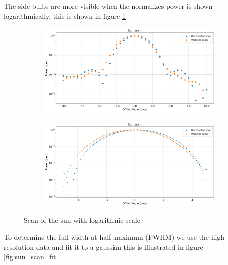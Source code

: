 The side bulbs are more visible when the normalizes power is shown logarithmically, this is shown in figure \ref{fig:sun_scan_log}
\begin{figure}[ht]
    \begin{subfigure}[t]{0.49\linewidth}
        \includegraphics[width=0.9\linewidth]{assets/sun_scan_low_res_log.png}
    \end{subfigure}
    \begin{subfigure}[t]{0.49\linewidth}
        \includegraphics[width=0.9\linewidth]{assets/sun_scan_high_res_log.png}
    \end{subfigure}
    \caption{Scan of the sun with logarithmic scale}
    \label{fig:sun_scan_log}
\end{figure}

To determine the full width at half maximum (FWHM) we use the high resolution data and fit it to a gaussian this is illustrated in figure \ref{fig:sun_scan_fit}

